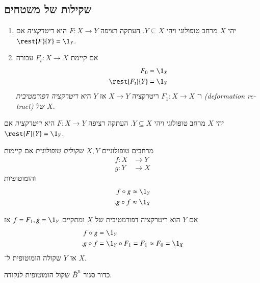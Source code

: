 \documentclass[a4paper,10pt,twoside,openany]{book}
\begin{document}
\subsection{שקילות של משטחים}

\begin{definition}[ריטרקציה]
\begin{enumerate}[label = (\roman*)]
\item יהי
$X$
מרחב טופולוגי ויהי
$Y \subseteq X$.
העתקה רציפה
$F \colon X \to Y$
היא
\emph{ריטרקציה}
אם
$\rest{F}{Y} = \1_Y$.
\item אם קיימת
$F_t \colon X \to X$
עבורה
\begin{align*}
F_0 &= \1_X \\
\rest{F_t}{Y} &= \1_Y
\end{align*}
ו־%
$F_1 \colon X \to X$
ריטרקציה
$X \to Y$
אז
$Y$
היא
\emph{ריטרקציה דפורמטיבית \textenglish{(deformation retract)}
של
$X$}.
\end{enumerate}
\end{definition}

\begin{definition}[ריטרקציה]
יהי
$X$
מרחב טופולוגי ויהי
$Y \subseteq X$.
העתקה רציפה
$F \colon X \to Y$
היא
\emph{ריטרקציה}
אם
$\rest{F}{Y} = \1_Y$.
\end{definition}

\begin{definition}
מרחבים טופולוגיים
$X,Y$
\emph{שקולים טופולוגית}
אם קיימות
\begin{align*}
f \colon X &\to Y \\
g \colon Y &\to X
\end{align*}
והומוטופיות
\begin{align*}
f \circ g \approx \1_Y \\
\text{.} g \circ f \approx \1_X
\end{align*}
\end{definition}

\begin{example}
אם
$Y$
הוא ריטרקציה דפורמטיבית של
$X$
ומתקיים
$f = F_1, g = \1_Y$
אז
\begin{align*}
f \circ g &= \1_Y \\
\text{.} g \circ f &= \1_Y \circ F_1 = F_1 \approx F_0 = \1_X
\end{align*}
אז
$Y$
שקולה הומוטופית ל־%
$X$.
\end{example}

\begin{example}
כדור סגור
$\bar{B}^n$
שקול הומוטופית לנקודה.
\end{example}
\end{document}

